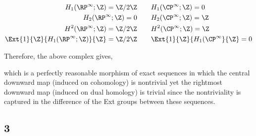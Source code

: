 \documentclass[12pt]{extarticle}
\begin{document}
\begin{align*}
H_{1}(\RP^\infty; \Z) = \Z/2\Z \quad & \quad H_{1}(\CP^\infty; \Z) = 0
\\
H_{2}(\RP^\infty; \Z) = 0 \quad & \quad H_{2}(\CP^\infty; \Z) = \Z
\\
H^2(\RP^\infty; \Z) = \Z / 2 \Z \quad & \quad H^2(\CP^\infty; \Z) = \Z
\\
\Ext{1}{\Z}{H_{1}(\RP^\infty; \Z)}{\Z} = \Z / 2 \Z \quad & \quad \Ext{1}{\Z}{H_1(\CP^\infty}{\Z} = 0
\end{align*}

Therefore, the above complex gives,
\begin{center}
\end{center}
which is a perfectly reasonable morphism of exact sequences in which the central downward map (induced on cohomology) is nontrivial yet the rightmost downward map (induced on dual homology) is trivial since the nontriviality is captured in the difference of the Ext groups between these sequences. 

\subsection{3}
\end{document}
